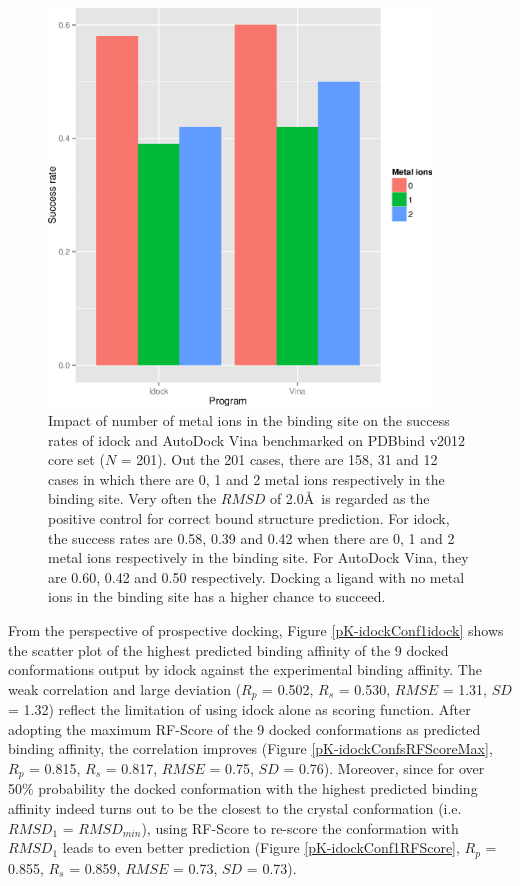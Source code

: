 \begin{figure}[!ht]
\begin{center}
\includegraphics[width=4in]{../istar/Program-NIONS.eps}
\end{center}
\caption{Impact of number of metal ions in the binding site on the success rates of idock and AutoDock Vina benchmarked on PDBbind v2012 core set ($N$ = 201). Out the 201 cases, there are 158, 31 and 12 cases in which there are 0, 1 and 2 metal ions respectively in the binding site. Very often the $RMSD$ of 2.0\AA\ is regarded as the positive control for correct bound structure prediction. For idock, the success rates are 0.58, 0.39 and 0.42 when there are 0, 1 and 2 metal ions respectively in the binding site. For AutoDock Vina, they are 0.60, 0.42 and 0.50 respectively. Docking a ligand with no metal ions in the binding site has a higher chance to succeed.}
\label{Program-NIONS}
\end{figure}

From the perspective of prospective docking, Figure \ref{pK-idockConf1idock} shows the scatter plot of the highest predicted binding affinity of the 9 docked conformations output by idock against the experimental binding affinity. The weak correlation and large deviation ($R_p$ = 0.502, $R_s$ = 0.530, $RMSE$ = 1.31, $SD$ = 1.32) reflect the limitation of using idock alone as scoring function. After adopting the maximum RF-Score of the 9 docked conformations as predicted binding affinity, the correlation improves (Figure \ref{pK-idockConfsRFScoreMax}, $R_p$ = 0.815, $R_s$ = 0.817, $RMSE$ = 0.75, $SD$ = 0.76). Moreover, since for over 50\% probability the docked conformation with the highest predicted binding affinity indeed turns out to be the closest to the crystal conformation (i.e. $RMSD_1$ = $RMSD_{min}$), using RF-Score to re-score the conformation with $RMSD_1$ leads to even better prediction (Figure \ref{pK-idockConf1RFScore}, $R_p$ = 0.855, $R_s$ = 0.859, $RMSE$ = 0.73, $SD$ = 0.73).%

